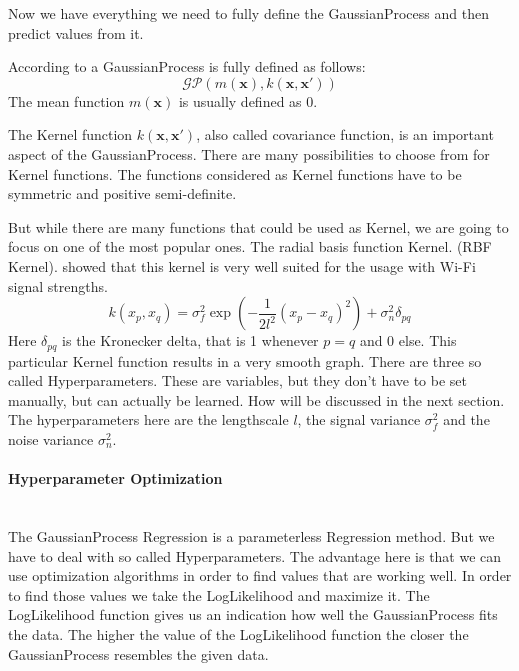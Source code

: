 Now we have everything we need to fully define the \Gls{GaussianProcess} and then predict values from it. 

According to \citet[p.\ 13]{Rasmussen:2005:GPM:1162254} a \Gls{GaussianProcess} is fully defined as follows:
\begin{equation}\label{eq:GP}
\mathcal{GP}(m(\mathbf{x}),k(\mathbf{x},\mathbf{x'}))
\end{equation}
The mean function $m(\mathbf{x})$ is usually defined as 0. 

The \gls{Kernel} function $k(\mathbf{x},\mathbf{x'})$, also called covariance function, is an important aspect of the \Gls{GaussianProcess}. There are many possibilities to choose from for \gls{Kernel} functions. The functions considered as \gls{Kernel} functions have to be symmetric and positive semi-definite. 

But while there are many functions that could be used as \gls{Kernel}, we are going to focus on one of the most popular ones. The radial basis function \gls{Kernel}. (RBF \gls{Kernel}). \citet{ferris2006gaussian} showed that this kernel is very well suited for the usage with Wi-Fi signal strengths. 
\begin{equation}\label{eq:rbf}
k(x_p,x_q) = \sigma_f^2\exp(-\dfrac{1}{2l^2}(x_p-x_q)^2)+\sigma_n^2\delta_{pq}
\end{equation} 
Here $\delta_{pq}$ is the Kronecker delta, that is 1 whenever $p=q$ and 0 else. This particular \gls{Kernel} function results in a very smooth graph. There are three so called \gls{Hyperparameter}s. These are variables, but they don't have to be set manually, but can actually be learned. How will be discussed in the next section. 
The hyperparameters here are the lengthscale $l$, the signal variance $\sigma_f^2$ and the noise variance $\sigma_n^2$. 

\paragraph{Hyperparameter Optimization}\mbox{}\\
The \Gls{GaussianProcess} \gls{Regression} is a parameterless \gls{Regression} method. But we have to deal with so called \gls{Hyperparameter}s. The advantage here is that we can use optimization algorithms in order to find values that are working well. In order to find those values we take the \gls{LogLikelihood} and maximize it. The \gls{LogLikelihood} function gives us an indication how well the \Gls{GaussianProcess} fits the data. The higher the value of the \gls{LogLikelihood} function the closer the \Gls{GaussianProcess} resembles the given data.

